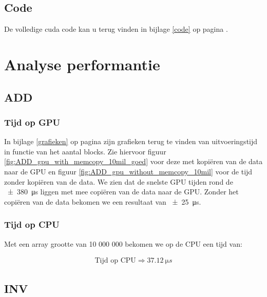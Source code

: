 \documentclass[twoside,a4paper]{article}
\begin{document}
\subsection{Code}
De volledige cuda code kan u terug vinden in bijlage \ref{code} op pagina \pageref{code}.

\section{Analyse performantie}

\subsection{ADD}
\subsubsection{Tijd op GPU}
In bijlage \ref{grafieken} op pagina \pageref{grafieken} zijn grafieken terug te vinden van uitvoeringstijd in functie van het aantal blocks.
Zie hiervoor figuur \ref{fig:ADD_gpu_with_memcopy_10mil_goed} voor deze met kopi\"eren van de data naar de GPU en figuur \ref{fig:ADD_gpu_without_memcopy_10mil} voor de tijd zonder kopi\"eren van de data.
We zien dat de snelste GPU tijden rond de \SI{\pm380}{\micro s} liggen met mee copi\"eren van de data naar de GPU. Zonder het copi\"eren van de data bekomen we een resultaat van \SI{\pm25}{\micro s}.


\subsubsection{Tijd op CPU}
Met een array grootte van 10 000 000 bekomen we op de CPU een tijd van:

\begin{align*}
    \text{Tijd op CPU} \Rightarrow \SI{37.12}{\micro s}
\end{align*}


\subsection{INV}
\end{document}
